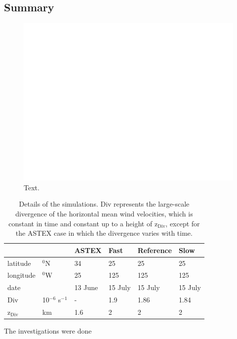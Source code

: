\documentclass[12pt]{article}
\begin{document}
\subsection{Summary }

%
\begin{figure}[ht]
\includegraphics[width=40pc]{wolk.pdf}
\caption{Text.}
\label{fig:test}
\end{figure}
%
%
 

\begin{table}
\begin{tabular}{ l l l l l l}
\hline
     &          & ASTEX & Fast & Reference & Slow \\           
\hline 
latitude  & $^0$N  &     34 &   25  &   25 & 25  \\
longitude & $^0$W  &     25 &   125  &   125 & 125  \\
date      &        & 13 June  & 15 July & 15 July & 15 July \\ 
Div       & 10$^{-6}$ s$^{-1}$   &  - & 1.9 & 1.86 & 1.84 \\  
z$_{\mathrm{Div}}$ & km & 1.6 & 2  & 2 & 2 \\
\hline       
\end{tabular}   
\caption{Details of the simulations. Div represents the large-scale divergence of the horizontal mean wind velocities, which is constant in time and constant up to a height of z$_{\mathrm{Div}}$, except for the ASTEX case in which the divergence varies with time.}
\label{tab:set_up}
\end{table}
 
\begin{acknowledgment}
The investigations were done  
\end{acknowledgment}
\end{document}
